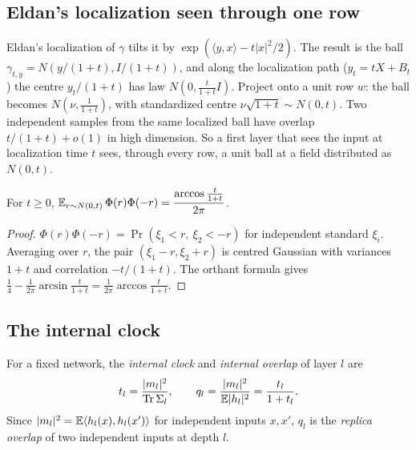 \label{sec:clock}
\subsection{Eldan's localization seen through one row}
Eldan's localization of $\gamma$ tilts it by $\exp(\langle y,x\rangle-t|x|^2/2)$. The result is the ball $\gamma_{t,y}=N(y/(1+t),I/(1+t))$,
and along the localization path ($y_t=tX+B_t$) the centre $y_t/(1+t)$ has law $N(0,\frac t{1+t}I)$. Project onto a unit row $w$:
the ball becomes $N(\nu,\frac1{1+t})$, with standardized centre $\nu\sqrt{1+t}\sim N(0,t)$. Two independent samples from the same
localized ball have overlap $t/(1+t)+o(1)$ in high dimension. So a first layer that sees the input at localization time $t$ sees,
through every row, a unit ball at a field distributed as $N(0,t)$.

\begin{lemma}\label{lem:field}
For $t\ge0$, $\mathbb E_{r\sim N(0,t)}\,\Phi(r)\Phi(-r)=\dfrac{\arccos\frac t{1+t}}{2\pi}$.
\end{lemma}
\begin{proof}
$\Phi(r)\Phi(-r)=\Pr(\xi_1<r,\ \xi_2<-r)$ for independent standard $\xi_i$. Averaging over $r$, the pair $(\xi_1-r,\xi_2+r)$ is centred
Gaussian with variances $1+t$ and correlation $-t/(1+t)$. The orthant formula gives $\frac14-\frac1{2\pi}\arcsin\frac t{1+t}=\frac1{2\pi}\arccos\frac t{1+t}$.
\end{proof}

\subsection{The internal clock}
\begin{definition}
For a fixed network, the \emph{internal clock} and \emph{internal overlap} of layer $l$ are
\[
t_l=\frac{|m_l|^2}{\operatorname{Tr}\Sigma_l},\qquad q_l=\frac{|m_l|^2}{\mathbb E|h_l|^2}=\frac{t_l}{1+t_l}.
\]
Since $|m_l|^2=\mathbb E\langle h_l(x),h_l(x')\rangle$ for independent inputs $x,x'$, $q_l$ is the \emph{replica overlap} of two independent inputs at depth $l$.
\end{definition}

